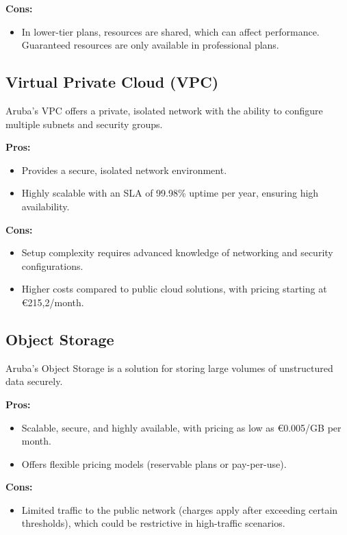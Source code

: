 \textbf{Cons:}
\begin{itemize}
    \item In lower-tier plans, resources are shared, which can affect performance. Guaranteed resources are only available in professional plans.
\end{itemize}

\subsection*{Virtual Private Cloud (VPC)}
Aruba’s VPC offers a private, isolated network with the ability to configure multiple subnets and security groups.

\textbf{Pros:}
\begin{itemize}
    \item Provides a secure, isolated network environment.
    \item Highly scalable with an SLA of 99.98\% uptime per year, ensuring high availability.
\end{itemize}

\textbf{Cons:}
\begin{itemize}
    \item Setup complexity requires advanced knowledge of networking and security configurations.
    \item Higher costs compared to public cloud solutions, with pricing starting at €215,2/month.
\end{itemize}

\subsection*{Object Storage}
Aruba’s Object Storage is a solution for storing large volumes of unstructured data securely.

\textbf{Pros:}
\begin{itemize}
    \item Scalable, secure, and highly available, with pricing as low as €0.005/GB per month.
    \item Offers flexible pricing models (reservable plans or pay-per-use).
\end{itemize}

\textbf{Cons:}
\begin{itemize}
    \item Limited traffic to the public network (charges apply after exceeding certain thresholds), which could be restrictive in high-traffic scenarios.
\end{itemize}

